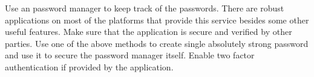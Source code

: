 \documentclass[acmsmall,nonacm]{acmart}
\begin{document}
Use an password manager to keep track of the passwords. There are robust applications on most of the platforms that provide this service besides some other useful features. Make sure that the application is secure and verified by other parties. Use one of the above methods to create single absolutely strong password and use it to secure the password manager itself. Enable two factor authentication if provided by the application.




\appendix
\end{document}

